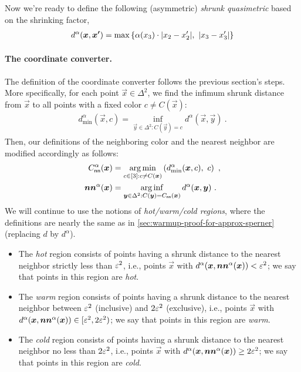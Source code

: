 Now we're ready to define the following (asymmetric) {\em shrunk quasimetric} 
based on the shrinking factor, 
\begin{align}
    \label{eqn:shrinking-distance}
    d^{\alpha}(\boldsymbol{x}, \boldsymbol{x'}) = \max\left \{{\alpha(x_3)\cdot |{x_2-x_2'} |,\ |{x_3-x_3'} |} \right \}
\end{align}

\paragraph{The coordinate converter.} The definition of the coordinate converter follows the previous section's steps. 
More specifically, for each point $\vec{x}\in \Delta^2$, we find the infimum shrunk distance from $\vec{x}$ to all points with a fixed color $c\neq C(\vec{x})$:  
\begin{align*}
    d_{\min}^{\alpha}(\vec{x}, c) = \inf_{\vec{y}\in \Delta^2: C(\vec{y})=c} 
    d^{\alpha}(\vec{x},\vec{y})
    ~.
\end{align*}
Then, our definitions of the neighboring color and the nearest neighbor are modified accordingly as follows: 
\begin{align}
    \label{eqn:cnn-and-nn-for-symmetric}
    \begin{split}
    C_{\sf nn}^{\alpha}(\boldsymbol{x}) &= \operatorname*{arg\,min}_{c\in [3]:c\neq C(\boldsymbol{x})} \left(d^{\alpha}_{\min}(\boldsymbol{x}, c),\ c\right)~,
    \\
    \operatorname*{\boldsymbol{nn}^{\alpha}}(\boldsymbol{x}) &= \operatorname*{arg\,inf}_{\boldsymbol{y}\in \Delta^2: C(\boldsymbol{y})=C_{\sf nn}(\boldsymbol{x})} d^{\alpha}(\boldsymbol{x},\boldsymbol{y})~.
    \end{split}
\end{align}
We will continue to use the notions of {\em hot/warm/cold regions}, where the definitions are nearly the same as in \cref{sec:warmup-proof-for-approx-sperner} (replacing $d$ by $d^{\alpha}$). 
\begin{itemize}[itemsep=0.2em,topsep=0.5em]
    \item The {\em hot} region consists of points having a shrunk distance to the nearest neighbor strictly less than $\varepsilon^2$, i.e., points $\vec{x}$ with $d^\alpha(\boldsymbol{x}, \operatorname*{\boldsymbol{nn}^{\alpha}}(\boldsymbol{x}))<\varepsilon^2$; we say that points in this region are {\em hot}.
    \item The {\em warm} region consists of points having a shrunk distance to the nearest neighbor between $\varepsilon^2$ (inclusive) and $2\varepsilon^2$ (exclusive), i.e., points $\vec{x}$ with $d^{\alpha}(\boldsymbol{x}, \operatorname*{\boldsymbol{nn}^{\alpha}}(\boldsymbol{x}))\in [\varepsilon^2,2\varepsilon^2)$; we say that points in this region are {\em warm}.
    \item The {\em cold} region consists of points having a shrunk distance to the nearest neighbor no less than $2\varepsilon^2$, i.e., points $\vec{x}$ with $d^\alpha(\boldsymbol{x}, \operatorname*{\boldsymbol{nn}^{\alpha}}(\boldsymbol{x}))\geq 2\varepsilon^2$; we say that points in this region are {\em cold}.
\end{itemize}
